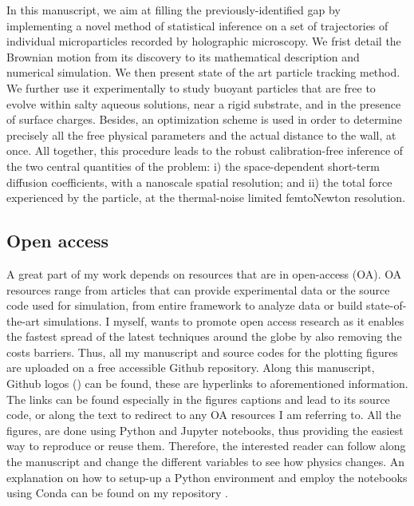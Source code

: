 In this manuscript, we aim at filling the previously-identified gap by implementing a novel method of statistical inference on a set of trajectories of individual microparticles recorded by holographic microscopy. We frist detail the Brownian motion from its discovery to its mathematical description and numerical simulation. We then present state of the art particle tracking method. We further use it experimentally to study  buoyant particles that are free to evolve within salty aqueous solutions, near a rigid substrate, and in the presence of surface charges. Besides, an optimization scheme is used in order to determine precisely all the free physical parameters and the actual distance to the wall, at once. All together, this procedure leads to the robust calibration-free inference of the two central quantities of the problem: i) the space-dependent short-term diffusion coefficients, with a nanoscale spatial resolution; and ii) the total force experienced by the particle, at the thermal-noise limited femtoNewton resolution. 



\subsection{Open access}

A great part of my work depends on resources that are in open-access (OA). OA resources range from articles that can provide experimental data or the source code used for simulation, from entire framework to analyze data or build state-of-the-art simulations. I myself, wants to promote open access research as it enables the fastest spread of the latest techniques around the globe by also removing the costs barriers. Thus, all my manuscript and source codes for the plotting figures are uploaded on a free accessible Github repository. Along this manuscript, Github logos (\href{https://github.com/eXpensia/Ma-these/}{\faGithub}) can be found, these are hyperlinks to aforementioned information. The links can be found especially in the figures captions and lead to its source code, or along the text to redirect to any OA resources I am referring to. All the figures, are done using Python and Jupyter notebooks, thus providing the easiest way to reproduce or reuse them. Therefore, the interested reader can follow along the manuscript and change the different variables to see how physics changes.  An explanation on how to setup-up a Python environment and employ the notebooks using Conda can be found on my repository \href{https://github.com/eXpensia/Ma-these/}{\faGithub}.


